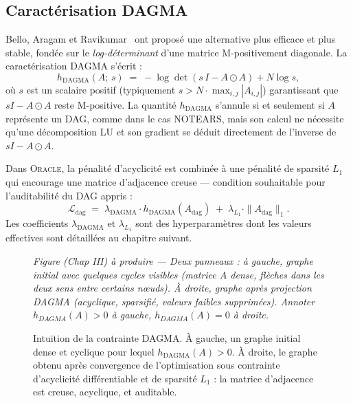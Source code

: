 \documentclass[14pt,a4paper,openany]{extreport}
\theoremstyle{definition}
\newcommand{\Oracle}{\textsc{Oracle}}
\newcommand{\Adag}{\ensuremath{A_{\mathrm{dag}}}}
\newcommand{\figplaceholder}[2][0.9\linewidth]{%
  \begin{tcolorbox}[width=#1,height=5cm,valign=center,colback=gray!8,colframe=gray!45,arc=2pt,boxrule=0.5pt]
    \centering\small\textit{#2}
  \end{tcolorbox}%
}
\begin{document}
\subsection{Caractérisation DAGMA}
\label{ssec:oracle-dagma-caract}

Bello, Aragam et Ravikumar~\cite{bello_dagma_2022} ont proposé une alternative plus efficace et plus stable, fondée sur le \emph{log-déterminant} d'une matrice M-positivement diagonale. La caractérisation DAGMA s'écrit :
\begin{equation}
  h_{\mathrm{DAGMA}}(A;\, s) \;=\; -\log \det\!\left( s\,I - A \odot A \right) + N \log s,
  \label{eq:dagma}
\end{equation}
où $s$ est un scalaire positif (typiquement $s > N \cdot \max_{i,j} |A_{i,j}|$) garantissant que $sI - A \odot A$ reste M-positive. La quantité $h_{\mathrm{DAGMA}}$ s'annule si et seulement si $A$ représente un DAG, comme dans le cas NOTEARS, mais son calcul ne nécessite qu'une décomposition LU et son gradient se déduit directement de l'inverse de $sI - A \odot A$.

Dans \Oracle{}, la pénalité d'acyclicité est combinée à une pénalité de sparsité $L_1$ qui encourage une matrice d'adjacence creuse --- condition souhaitable pour l'auditabilité du DAG appris :
\begin{equation}
  \mathcal{L}_{\mathrm{dag}} \;=\; \lambda_{\mathrm{DAGMA}} \cdot h_{\mathrm{DAGMA}}(\Adag) \;+\; \lambda_{L_1} \cdot \|\Adag\|_1.
  \label{eq:loss-dag}
\end{equation}
Les coefficients $\lambda_{\mathrm{DAGMA}}$ et $\lambda_{L_1}$ sont des hyperparamètres dont les valeurs effectives sont détaillées au chapitre suivant.

\begin{figure}[ht]
  \centering
  \figplaceholder[0.85\linewidth]{Figure (Chap III) à produire --- Deux panneaux : à gauche, graphe initial avec quelques cycles visibles (matrice $A$ dense, flèches dans les deux sens entre certains nœuds). À droite, graphe après projection DAGMA (acyclique, sparsifié, valeurs faibles supprimées). Annoter $h_{DAGMA}(A) > 0$ à gauche, $h_{DAGMA}(A) = 0$ à droite.}
  \caption{Intuition de la contrainte DAGMA. À gauche, un graphe initial dense et cyclique pour lequel $h_{\mathrm{DAGMA}}(A) > 0$. À droite, le graphe obtenu après convergence de l'optimisation sous contrainte d'acyclicité différentiable et de sparsité $L_1$ : la matrice d'adjacence est creuse, acyclique, et auditable.}
  \label{fig:dagma-intuition}
\end{figure}
\end{document}
